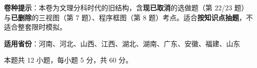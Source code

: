 

\begin{gknotice}
\textbf{ 卷种提示}：本卷为文理分科时代的旧结构，含\textbf{现已取消}的选做题（第 22/23 题）与\textbf{已删除}的三视图（第 7 题）、程序框图（第 8 题）考点。适合\textbf{按知识点抽题}，不适合整套限时模拟。

\textbf{适用省份}：河南、河北、山西、江西、湖北、湖南、广东、安徽、福建、山东
\end{gknotice}

\par\medskip


\begin{gktip}
本题共 12 小题，每小题 5 分，共 60 分。
\end{gktip}

